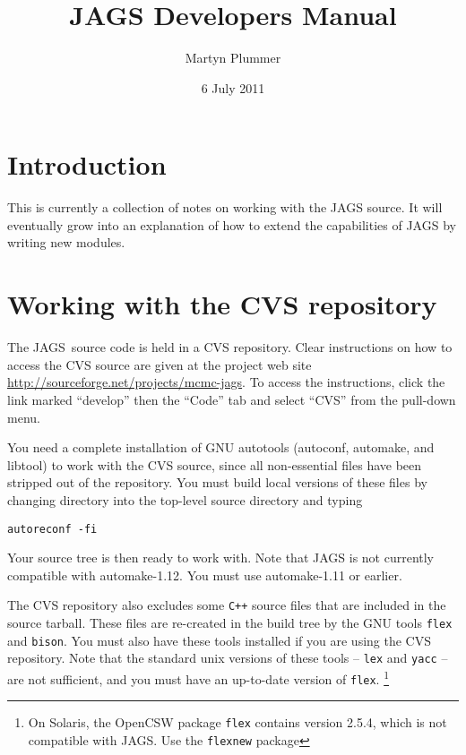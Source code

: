 \documentclass[11pt, a4paper, titlepage]{report}
\newcommand{\JAGS}{\textsf{JAGS}}
\begin{document}
\title{JAGS Developers Manual}
\author{Martyn Plummer}
\date{6 July 2011}
\maketitle

\tableofcontents

\chapter{Introduction}

This is currently a collection of notes on working with the JAGS
source. It will eventually grow into an explanation of how to extend
the capabilities of JAGS by writing new modules.

\chapter{Working with the CVS repository}

The \JAGS\ source code is held in a CVS repository.  Clear
instructions on how to access the CVS source are given at the project
web site \url{http://sourceforge.net/projects/mcmc-jags}. To access
the instructions, click the link marked ``develop'' then the ``Code''
tab and select ``CVS'' from the pull-down menu.

You need a complete installation of GNU autotools (autoconf, automake,
and libtool) to work with the CVS source, since all non-essential
files have been stripped out of the repository. You must build local
versions of these files by changing directory into the top-level
source directory and typing
\begin{verbatim}
autoreconf -fi
\end{verbatim}
Your source tree is then ready to work with.  Note that JAGS is not
currently compatible with automake-1.12.  You must use automake-1.11
or earlier.

The CVS repository also excludes some \texttt{C++} source files that
are included in the source tarball. These files are re-created in the
build tree by the GNU tools \verb+flex+ and \verb+bison+. You must
also have these tools installed if you are using the CVS
repository. Note that the standard unix versions of these tools --
\verb+lex+ and \verb+yacc+ -- are not sufficient, and you must have an
up-to-date version of \verb+flex+. \footnote{On Solaris, the OpenCSW
  package \texttt{flex} contains version 2.5.4, which is not compatible
  with JAGS. Use the \texttt{flexnew} package}
\end{document}
